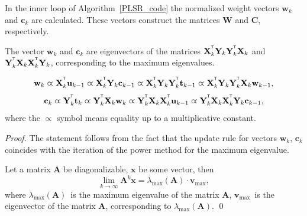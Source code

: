 \documentclass[runningheads]{llncs}
\newcommand{\bx}{\mathbf{x}}
\newcommand{\bw}{\mathbf{w}}
\newcommand{\bY}{\mathbf{Y}}
\newcommand{\bX}{\mathbf{X}}
\newcommand{\bu}{\mathbf{u}}
\newcommand{\bt}{\mathbf{t}}
\newcommand{\bc}{\mathbf{c}}
\newcommand{\bC}{\mathbf{C}}
\newcommand{\bW}{\mathbf{W}}
\newcommand{\T}{^{\text{\tiny\sffamily\upshape\mdseries T}}}
\begin{document}
In the inner loop of Algorithm~\ref{PLSR_code} the normalized weight vectors $\bw_k$ and $\bc_k$ are calculated. 
These vectors construct the matrices $\bW$ and $\bC$, respectively.

\begin{proposition}
	The vector $\bw_k$ and $\bc_k$ are eigenvectors of the matrices $\bX_k^{\T} \bY_k \bY_k^{\T} \bX_k$ and $\bY_k^{\T} \bX_k \bX_k^{\T} \bY_k$, corresponding to the maximum eigenvalues.
	
	\begin{equation*}
	\bw_k \varpropto \bX_k^{\T} \bu_{k-1} \varpropto \bX_k^{\T} \bY_k \bc_{k-1} \varpropto \bX_k^{\T} \bY_k \bY_k^{\T} \bt_{k-1} \varpropto \bX_k^{\T} \bY_k \bY_k^{\T} \bX_k \bw_{k-1},
	\end{equation*}
	\begin{equation*}
	\bc_k \varpropto \bY_k^{\T} \bt_k \varpropto \bY_k^{\T} \bX_k \bw_k \varpropto \bY_k^{\T} \bX_k \bX_k^{\T} \bu_{k-1} \varpropto \bY_k^{\T} \bX_k \bX_k^{\T} \bY_k \bc_{k-1},
	\end{equation*}
	where the $\varpropto$ symbol means equality up to a multiplicative constant.
	\label{st::eig}
\end{proposition}
\begin{proof}
The statement follows from the fact that the update rule for vectors $\bw_k$, $\bc_k$ coincides with the iteration of the power method for the maximum eigenvalue.

Let a matrix $\mathbf{A}$ be diagonalizable, $\bx$ be some vector, then
\[
	\lim_{k \rightarrow \infty} \mathbf{A}^k \bx = \lambda_{\max}(\mathbf{A}) \cdot \mathbf{v}_{\max},
\]
where $ \lambda_{\max} (\mathbf{A})$~is the maximum eigenvalue of the matrix $\mathbf{A}$, $\mathbf{v}_{\max}$~is the eigenvector of the matrix $\mathbf{A}$, corresponding to $ \lambda_{\max} (\mathbf{A})$.
\qed
\end{proof}
\end{document}
